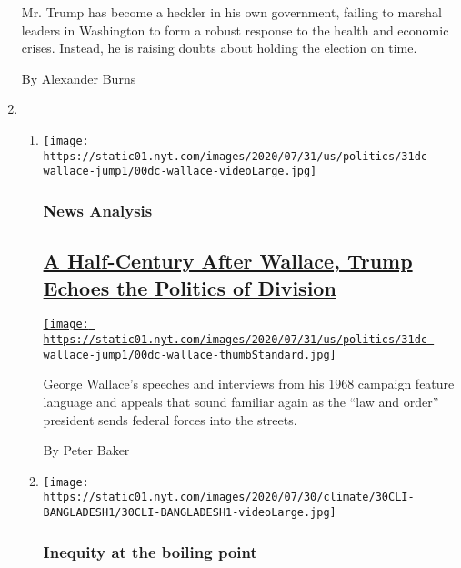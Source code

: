 \begin{enumerate}
  Mr. Trump has become a heckler in his own government, failing to
  marshal leaders in Washington to form a robust response to the health
  and economic crises. Instead, he is raising doubts about holding the
  election on time.

  By Alexander Burns
\item
  \begin{enumerate}
  \def\labelenumii{\arabic{enumii}.}
  \item
    \texttt{[image: https://static01.nyt.com/images/2020/07/31/us/politics/31dc-wallace-jump1/00dc-wallace-videoLarge.jpg]}

    \hypertarget{news-analysis-1}{%
    \subsubsection{News Analysis}\label{news-analysis-1}}

    \hypertarget{a-half-century-after-wallace-trump-echoes-the-politics-of-division}{%
    \subsection{\texorpdfstring{\href{/2020/07/30/us/politics/trump-wallace.html}{A
    Half-Century After Wallace, Trump Echoes the Politics of
    Division}}{A Half-Century After Wallace, Trump Echoes the Politics of Division}}\label{a-half-century-after-wallace-trump-echoes-the-politics-of-division}}

    \href{/2020/07/30/us/politics/trump-wallace.html}{\texttt{[image: https://static01.nyt.com/images/2020/07/31/us/politics/31dc-wallace-jump1/00dc-wallace-thumbStandard.jpg]}}

    George Wallace's speeches and interviews from his 1968 campaign
    feature language and appeals that sound familiar again as the ``law
    and order'' president sends federal forces into the streets.

    By Peter Baker
  \item
    \texttt{[image: https://static01.nyt.com/images/2020/07/30/climate/30CLI-BANGLADESH1/30CLI-BANGLADESH1-videoLarge.jpg]}

    \hypertarget{inequity-at-the-boiling-point}{%
    \subsubsection{Inequity at the boiling
    point}\label{inequity-at-the-boiling-point}}

    \hypertarget{a-quarter-of-bangladesh-is-flooded-millions-have-lost-everything}{%
}
\end{enumerate}
\end{enumerate}
